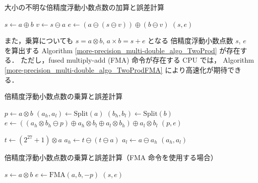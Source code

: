 \begin{algorithm}[tp]
    \caption{大小の不明な倍精度浮動小数点数の加算と誤差計算\cite[Algorithm 4]{Hida2001}}
    \label{more-precision_multi-double_algo_TwoSum}
    \begin{algorithmic}
        \State $s \gets a \oplus b$
        \State $v \gets s \ominus a$
        \State $e \gets (a \ominus (s \ominus v)) \oplus (b \ominus v)$
        \State \Return $(s, e)$
        \EndProcedure
    \end{algorithmic}
\end{algorithm}

また，乗算についても
$s = a \otimes b$, $a \times b = s + e$ となる
倍精度浮動小数点数 $s$, $e$ を算出する
Algorithm \ref{more-precision_multi-double_algo_TwoProd} が存在する．
ただし，fused multiply-add (FMA) 命令が存在する CPU では，
Algorithm \ref{more-precision_multi-double_algo_TwoProdFMA} により高速化が期待できる．

\begin{algorithm}[tp]
    \caption{倍精度浮動小数点数の乗算と誤差計算\cite[Algorithm 5, 6]{Hida2001}}
    \label{more-precision_multi-double_algo_TwoProd}
    \begin{algorithmic}
        \State $p \gets a \otimes b$
        \State $(a_h, a_l) \gets \text{Split}(a)$
        \State $(b_h, b_l) \gets \text{Split}(b)$
        \State $e \gets ((a_h \otimes b_h \ominus p) \oplus a_h \otimes b_l \oplus a_l \otimes b_h) \oplus a_l \otimes b_l$
        \State \Return $(p, e)$
        \EndProcedure
    \end{algorithmic}
    \begin{algorithmic}
        \State $t \gets (2^{27} + 1) \otimes a$
        \State $a_h \gets t \ominus (t \ominus a)$
        \State $a_l \gets a \ominus a_h$
        \State \Return $(a_h, a_l)$
        \EndProcedure
    \end{algorithmic}
\end{algorithm}

\begin{algorithm}[tp]
    \caption{倍精度浮動小数点数の乗算と誤差計算（FMA 命令を使用する場合）\cite[Algorithm 7]{Hida2001}}
    \label{more-precision_multi-double_algo_TwoProdFMA}
    \begin{algorithmic}
        \State $s \gets a \otimes b$
        \State $e \gets \text{FMA}(a, b, -p)$
        \State \Return $(s, e)$
        \EndProcedure
    \end{algorithmic}
\end{algorithm}

